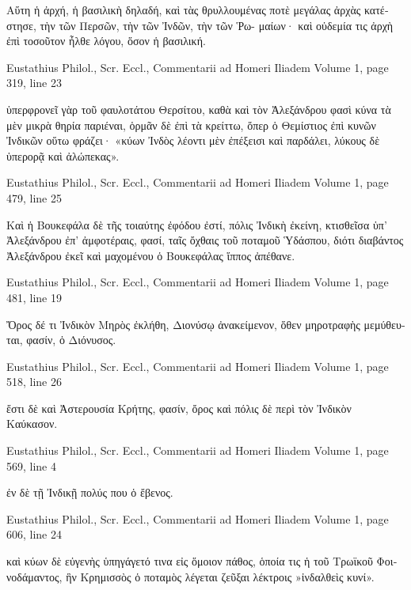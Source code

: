 \documentclass[12pt,letterpaper,twoside,final]{memoir}
\begin{document}
\begin{greek}
           Αὕτη ἡ ἀρχή, ἡ βασιλικὴ δηλαδή, καὶ τὰς θρυλλουμένας ποτὲ 
μεγάλας ἀρχὰς κατέστησε, τὴν τῶν Περσῶν, τὴν τῶν Ἰνδῶν, τὴν τῶν Ῥω-
μαίων· καὶ οὐδεμία τις ἀρχὴ ἐπὶ τοσοῦτον ἦλθε λόγου, ὅσον ἡ βασιλική. 



Eustathius Philol., Scr. Eccl., Commentarii ad Homeri Iliadem 
Volume 1, page 319, line 23

ὑπερφρονεῖ γὰρ τοῦ φαυλοτάτου Θερσίτου, καθὰ καὶ τὸν Ἀλεξάνδρου φασὶ 
κύνα τὰ μὲν μικρὰ θηρία παριέναι, ὁρμᾶν δὲ ἐπὶ τὰ κρείττω, ὅπερ ὁ Θεμίστιος 
ἐπὶ κυνῶν Ἰνδικῶν οὕτω φράζει· «κύων Ἰνδὸς λέοντι μὲν ἐπέξεισι καὶ παρδάλει, 
λύκους δὲ ὑπερορᾷ καὶ ἀλώπεκας». 



Eustathius Philol., Scr. Eccl., Commentarii ad Homeri Iliadem 
Volume 1, page 479, line 25

                Καὶ ἡ Βουκεφάλα δὲ τῆς τοιαύτης ἐφόδου ἐστί, πόλις Ἰνδικὴ ἐκείνη, 
κτισθεῖσα ὑπ' Ἀλεξάνδρου ἐπ' ἀμφοτέραις, φασί, ταῖς ὄχθαις τοῦ ποταμοῦ 
Ὑδάσπου, διότι διαβάντος Ἀλεξάνδρου ἐκεῖ καὶ μαχομένου ὁ Βουκεφάλας 
ἵππος ἀπέθανε. 



Eustathius Philol., Scr. Eccl., Commentarii ad Homeri Iliadem 
Volume 1, page 481, line 19

                                            Ὄρος δέ τι Ἰνδικὸν Μηρὸς ἐκλήθη, 
Διονύσῳ ἀνακείμενον, ὅθεν μηροτραφὴς μεμύθευται, φασίν, ὁ Διόνυσος. 



Eustathius Philol., Scr. Eccl., Commentarii ad Homeri Iliadem 
Volume 1, page 518, line 26

                                                         ἔστι δὲ καὶ Ἀστερουσία 
Κρήτης, φασίν, ὄρος καὶ πόλις δὲ περὶ τὸν Ἰνδικὸν Καύκασον. 



Eustathius Philol., Scr. Eccl., Commentarii ad Homeri Iliadem 
Volume 1, page 569, line 4

                ἐν δὲ τῇ Ἰνδικῇ πολύς που ὁ ἔβενος. 



Eustathius Philol., Scr. Eccl., Commentarii ad Homeri Iliadem 
Volume 1, page 606, line 24

                                     καὶ κύων δὲ εὐγενὴς ὑπηγάγετό τινα εἰς ὅμοιον 
πάθος, ὁποία τις ἡ τοῦ Τρωϊκοῦ Φοινοδάμαντος, ἣν Κρημισσὸς ὁ ποταμὸς 
λέγεται ζεῦξαι λέκτροις »ἰνδαλθεὶς κυνί». 




\end{greek}
\end{document}
